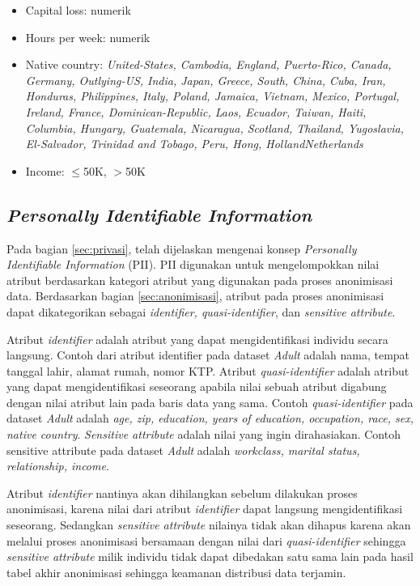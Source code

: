 \begin{itemize}
\item Capital loss: numerik

\item Hours per week: numerik

\item Native country: \textit{United-States, Cambodia, England, Puerto-Rico, Canada, Germany, Outlying-US, India, Japan, Greece, South, China, Cuba, Iran, Honduras, Philippines, Italy, Poland, Jamaica, Vietnam, Mexico, Portugal, Ireland, France, Dominican-Republic, Laos, Ecuador, Taiwan, Haiti, Columbia, Hungary, Guatemala, Nicaragua, Scotland, Thailand, Yugoslavia, El-Salvador, Trinidad and Tobago, Peru, Hong, HollandNetherlands}

\item Income: $\leq$50K, $>$50K
\end{itemize}


\subsection{\textit{Personally Identifiable Information}}
Pada bagian \ref{sec:privasi}, telah dijelaskan mengenai konsep \textit{Personally Identifiable Information} (PII). PII digunakan untuk mengelompokkan nilai atribut berdasarkan kategori atribut yang digunakan pada proses anonimisasi data. Berdasarkan bagian \ref{sec:anonimisasi}, atribut pada proses anonimisasi dapat dikategorikan sebagai \textit{identifier, quasi-identifier}, dan \textit{sensitive attribute}. 
\par Atribut \textit{identifier} adalah atribut yang dapat mengidentifikasi individu secara langsung. Contoh dari atribut identifier pada dataset \textit{Adult} adalah nama, tempat tanggal lahir, alamat rumah, nomor KTP. Atribut \textit{quasi-identifier} adalah atribut yang dapat mengidentifikasi seseorang apabila nilai sebuah atribut digabung dengan nilai atribut lain pada baris data yang sama. Contoh \textit{quasi-identifier} pada dataset \textit{Adult} adalah \textit{age, zip, education, years of education, occupation, race, sex, native country}. \textit{Sensitive attribute} adalah nilai yang ingin dirahasiakan. Contoh sensitive attribute pada dataset \textit{Adult} adalah \textit{workclass, marital status, relationship, income}.
\par Atribut \textit{identifier} nantinya akan dihilangkan sebelum dilakukan proses anonimisasi, karena nilai dari atribut \textit{identifier} dapat langsung mengidentifikasi seseorang. Sedangkan \textit{sensitive attribute} nilainya tidak akan dihapus karena akan melalui proses anonimisasi bersamaan dengan nilai dari \textit{quasi-identifier} sehingga \textit{sensitive attribute} milik individu tidak dapat dibedakan satu sama lain pada hasil tabel akhir anonimisasi sehingga keamanan  distribusi data terjamin.


